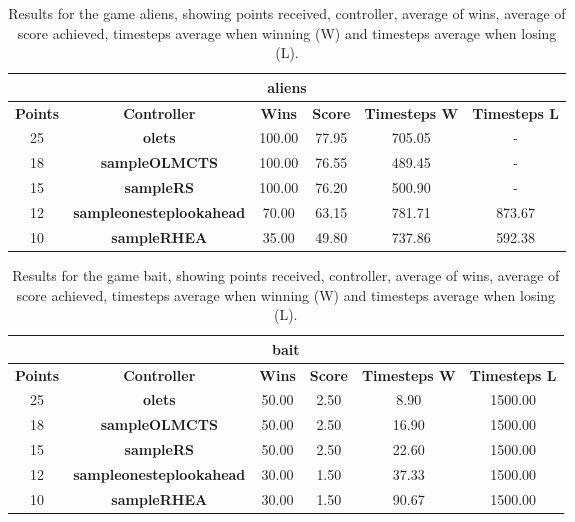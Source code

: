 \begin{table*}[!t]
\begin{center}
\begin{tabular}{|c|c|c|c|c|c|}
\multicolumn{6}{c}{\textbf{aliens}}\\
\hline
\textbf{Points} & \textbf{Controller} & \textbf{Wins} &  \textbf{Score} & \textbf{Timesteps W} & \textbf{Timesteps L}\\
\hline
25 & \textbf{olets} & 100.00 & 77.95 & 705.05 &  - 
 \\
\hline
18 & \textbf{sampleOLMCTS} & 100.00 & 76.55 & 489.45 &  - 
 \\
\hline
15 & \textbf{sampleRS} & 100.00 & 76.20 & 500.90 &  - 
 \\
\hline
12 & \textbf{sampleonesteplookahead} & 70.00 & 63.15 & 781.71 & 873.67
 \\
\hline
10 & \textbf{sampleRHEA} & 35.00 & 49.80 & 737.86 & 592.38
 \\
\hline
\end{tabular}
\caption{Results for the game aliens, showing points received, controller, average of wins, average of score achieved, timesteps average when winning (W) and timesteps average when losing (L).}
\label{tab:weights}
\end{center}
\end{table*}
\begin{table*}[!t]
\begin{center}
\begin{tabular}{|c|c|c|c|c|c|}
\multicolumn{6}{c}{\textbf{bait}}\\
\hline
\textbf{Points} & \textbf{Controller} & \textbf{Wins} &  \textbf{Score} & \textbf{Timesteps W} & \textbf{Timesteps L}\\
\hline
25 & \textbf{olets} & 50.00 & 2.50 & 8.90 & 1500.00
 \\
\hline
18 & \textbf{sampleOLMCTS} & 50.00 & 2.50 & 16.90 & 1500.00
 \\
\hline
15 & \textbf{sampleRS} & 50.00 & 2.50 & 22.60 & 1500.00
 \\
\hline
12 & \textbf{sampleonesteplookahead} & 30.00 & 1.50 & 37.33 & 1500.00
 \\
\hline
10 & \textbf{sampleRHEA} & 30.00 & 1.50 & 90.67 & 1500.00
 \\
\hline
\end{tabular}
\caption{Results for the game bait, showing points received, controller, average of wins, average of score achieved, timesteps average when winning (W) and timesteps average when losing (L).}
\label{tab:weights}
\end{center}
\end{table*}
